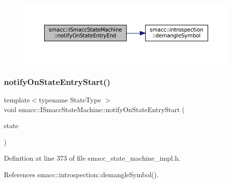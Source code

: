 \nopagebreak
\begin{figure}[H]
\begin{center}
\leavevmode
\includegraphics[width=350pt]{classsmacc_1_1ISmaccStateMachine_a856cf2d25d84659b974cccfbf44aeec9_cgraph}
\end{center}
\end{figure}
\mbox{\label{classsmacc_1_1ISmaccStateMachine_aeec54e997d715b105ebfeb5caadc4fbf}} 
\subsubsection{\texorpdfstring{notify\+On\+State\+Entry\+Start()}{notifyOnStateEntryStart()}}
{\footnotesize\ttfamily template$<$typename State\+Type $>$ \\
void smacc\+::\+I\+Smacc\+State\+Machine\+::notify\+On\+State\+Entry\+Start (\begin{DoxyParamCaption}\item[{State\+Type $\ast$}]{state }\end{DoxyParamCaption})}



Definition at line 373 of file smacc\+\_\+state\+\_\+machine\+\_\+impl.\+h.



References smacc\+::introspection\+::demangle\+Symbol().


